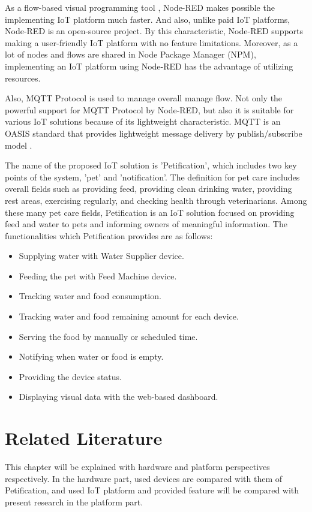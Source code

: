\documentclass[conference]{IEEEtran}
\begin{document}
\indent As a flow-based visual programming tool \cite{b8}, Node-RED makes possible the implementing IoT platform much faster. And also, unlike paid IoT platforms, Node-RED is an open-source project. By this characteristic, Node-RED supports making a user-friendly IoT platform with no feature limitations. Moreover, as a lot of nodes and flows are shared in Node Package Manager (NPM), implementing an IoT platform using Node-RED has the advantage of utilizing resources.

\indent Also, MQTT Protocol is used to manage overall manage flow. Not only the powerful support for MQTT Protocol by Node-RED, but also it is suitable for various IoT solutions because of its lightweight characteristic. MQTT is an OASIS standard that provides lightweight message delivery by publish/subscribe model \cite{b9}.

The name of the proposed IoT solution is 'Petification', which includes two key points of the system, 'pet' and 'notification'. The definition for pet care includes overall fields such as providing feed, providing clean drinking water, providing rest areas, exercising regularly, and checking health through veterinarians. \cite{b10}  Among these many pet care fields, Petification is an IoT solution focused on providing feed and water to pets and informing owners of meaningful information. The functionalities which Petification provides are as follows:
\begin{itemize}
\item Supplying water with Water Supplier device.
\item Feeding the pet with Feed Machine device.
\item Tracking water and food consumption.
\item Tracking water and food remaining amount for each device.
\item Serving the food by manually or scheduled time.
\item Notifying when water or food is empty.
\item Providing the device status.
\item Displaying visual data with the web-based dashboard.
\end{itemize}

\section{Related Literature}
This chapter will be explained with hardware and platform perspectives respectively. In the hardware part, used devices are compared with them of Petification, and used IoT platform and provided feature will be compared with present research in the platform part.
\end{document}
